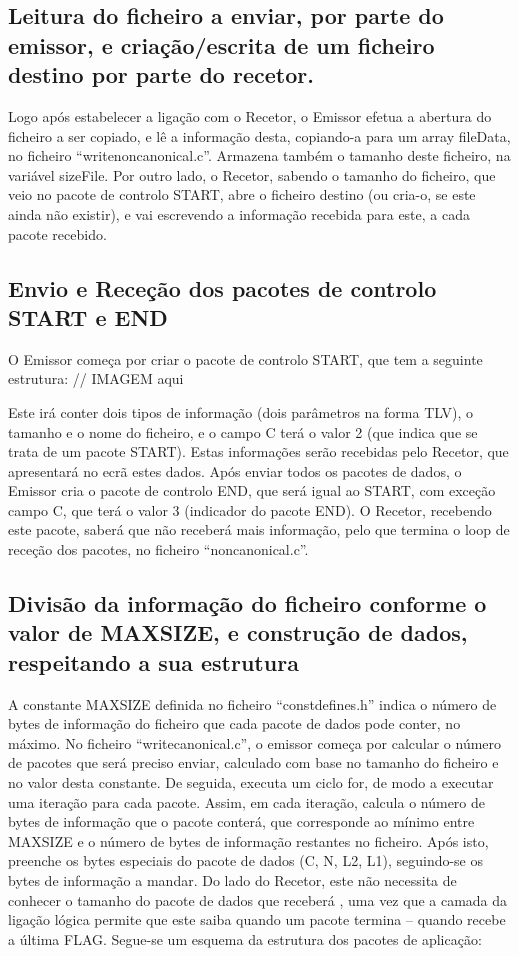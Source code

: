 \documentclass[article, a4paper, 11pt, oneside]{memoir}
\begin{document}
\subsection{Leitura do ficheiro a enviar, por parte do emissor, e criação/escrita de um ficheiro destino por parte do recetor.} 

Logo após estabelecer a ligação com o Recetor, o Emissor efetua a abertura do ficheiro a ser copiado, e lê a informação desta,
copiando-a para um array fileData, no ficheiro “writenoncanonical.c”. Armazena também o 
tamanho deste ficheiro, na variável sizeFile. Por outro lado, o Recetor, sabendo o tamanho 
do ficheiro, que veio no pacote de controlo START, abre o ficheiro destino (ou cria-o, se 
este ainda não existir), e vai escrevendo a informação recebida para este, a cada pacote recebido.

\subsection{Envio e Receção dos pacotes de controlo START e END}
O Emissor começa por criar o pacote de controlo START, que tem a seguinte estrutura:
// IMAGEM aqui


Este irá conter dois tipos de informação (dois parâmetros na forma TLV), o tamanho e o nome do ficheiro,
 e o campo C terá o valor 2 (que indica que se trata de um pacote START). 
Estas informações serão recebidas pelo Recetor, que apresentará no ecrã estes dados.
Após enviar todos os pacotes de dados, o Emissor cria o pacote de controlo END, que será igual ao START, com exceção 
 campo C, que terá o valor 3 (indicador do pacote END). 
O Recetor, recebendo este pacote, saberá que não receberá mais informação, pelo que termina o loop de receção dos
 pacotes, no ficheiro “noncanonical.c”.

\subsection{Divisão da informação do ficheiro conforme o valor de MAX\textunderscore SIZE, e construção de dados, respeitando a 
sua estrutura}

A constante MAX\textunderscore SIZE definida no ficheiro “constdefines.h” indica o número de bytes de informação do
ficheiro que cada pacote de dados pode conter, no máximo.
No ficheiro “writecanonical.c”, o emissor começa por calcular o número de pacotes que será preciso enviar, 
calculado com base no tamanho do ficheiro e no valor desta constante. De seguida, executa um ciclo for, de modo 
a executar uma iteração para cada pacote. 
Assim, em cada iteração, calcula o número de bytes de informação que o pacote conterá, que corresponde ao 
mínimo entre MAX\textunderscore SIZE e o número de bytes de informação 
restantes no ficheiro. Após isto, preenche os bytes especiais do pacote de dados (C, N, L2, L1), seguindo-se 
os bytes de informação a mandar. Do lado do Recetor, 
este não necessita de conhecer o tamanho do pacote de dados que receberá , uma vez que a camada da ligação 
lógica permite que este saiba quando um pacote termina – quando recebe a última FLAG. Segue-se um esquema 
da estrutura dos pacotes de aplicação:
\end{document}
